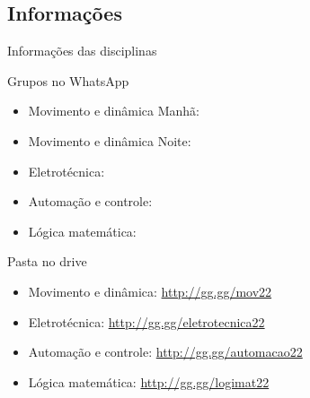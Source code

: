 \documentclass{beamer}
\begin{document}
\subsection{Informações}
%
\begin{frame}{Informações das disciplinas}
    \begin{block}{Grupos no WhatsApp}
        \begin{itemize}
            \item Movimento e dinâmica Manhã: \url{}
            \item Movimento e dinâmica Noite: \url{}
            \item Eletrotécnica: \url{}
            \item Automação e controle: \url{}
            \item Lógica matemática: \url{}
        \end{itemize}        
    \end{block}
    \begin{block}{Pasta no drive}
        \begin{itemize}
            \item Movimento e dinâmica: \url{http://gg.gg/mov22}
            \item Eletrotécnica: \url{http://gg.gg/eletrotecnica22}
            \item Automação e controle: \url{http://gg.gg/automacao22}
            \item Lógica matemática: \url{http://gg.gg/logimat22}
        \end{itemize}
    \end{block}
\end{frame}
%
\end{document}
